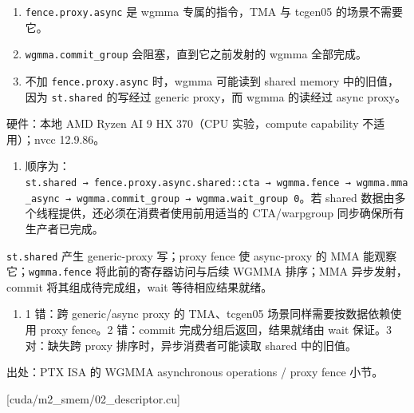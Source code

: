 \documentclass[11pt,a4paper,fontset=fandol]{ctexart}
\providecommand{\tightlist}{\setlength{\itemsep}{0pt}\setlength{\parskip}{0pt}}
\begin{document}
\begin{enumerate}
\def\labelenumi{\arabic{enumi}.}
\tightlist
\item
  \texttt{fence.\allowbreak{}proxy.\allowbreak{}async} 是 wgmma
  专属的指令，TMA 与 tcgen05 的场景不需要它。
\item
  \texttt{wgmma.\allowbreak{}commit\_\allowbreak{}group}
  会阻塞，直到它之前发射的 wgmma 全部完成。
\item
  不加 \texttt{fence.\allowbreak{}proxy.\allowbreak{}async} 时，wgmma
  可能读到 shared memory 中的旧值，因为 \texttt{st.\allowbreak{}shared}
  的写经过 generic proxy，而 wgmma 的读经过 async proxy。
\end{enumerate}

\begin{answer}

硬件：本地 AMD Ryzen AI 9 HX 370（CPU 实验，compute capability
不适用）；nvcc 12.9.86。

\begin{enumerate}
\def\labelenumi{(\alph{enumi})}
\tightlist
\item
  顺序为：\texttt{st.\allowbreak{}shared\ →\ fence.\allowbreak{}proxy.\allowbreak{}async.\allowbreak{}shared:\allowbreak{}:\allowbreak{}cta\ →\ wgmma.\allowbreak{}fence\ →\ wgmma.\allowbreak{}mma\_\allowbreak{}async\ →\ wgmma.\allowbreak{}commit\_\allowbreak{}group\ →\ wgmma.\allowbreak{}wait\_\allowbreak{}group\ 0}。若
  shared 数据由多个线程提供，还必须在消费者使用前用适当的 CTA/warpgroup
  同步确保所有生产者已完成。
\end{enumerate}

\texttt{st.\allowbreak{}shared} 产生 generic-proxy 写；proxy fence 使
async-proxy 的 MMA 能观察它；\texttt{wgmma.\allowbreak{}fence}
将此前的寄存器访问与后续 WGMMA 排序；MMA 异步发射，commit
将其组成待完成组，wait 等待相应结果就绪。

\begin{enumerate}
\def\labelenumi{(\alph{enumi})}
\setcounter{enumi}{1}
\tightlist
\item
  1 错：跨 generic/async proxy 的 TMA、tcgen05
  场景同样需要按数据依赖使用 proxy fence。2 错：commit
  完成分组后返回，结果就绪由 wait 保证。3 对：缺失跨 proxy
  排序时，异步消费者可能读取 shared 中的旧值。
\end{enumerate}

出处：PTX ISA 的 WGMMA asynchronous operations / proxy fence 小节。

\end{answer}

[cuda/m2\_smem/02\_descriptor.cu]
\end{document}
